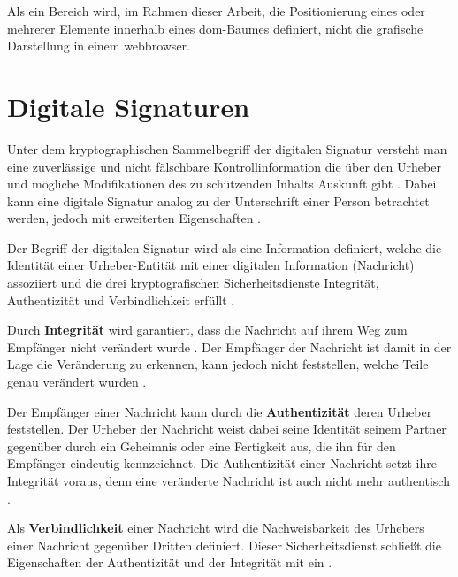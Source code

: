 Als ein Bereich wird, im Rahmen dieser Arbeit, die Positionierung eines oder mehrerer Elemente innerhalb eines \gls{dom}-Baumes definiert, nicht die grafische
Darstellung in einem \gls{webbrowser}.

\section{Digitale Signaturen}
\label{sec:GrundlagenDefinitionen:DigitaleSignaturen}
Unter dem kryptographischen Sammelbegriff der digitalen Signatur versteht man eine zuverlässige und nicht fälschbare Kontrollinformation die über den Urheber
und mögliche Modifikationen des zu schützenden Inhalts Auskunft gibt \cite{kits}. Dabei kann eine digitale Signatur analog zu der Unterschrift einer Person
betrachtet werden, jedoch mit erweiterten Eigenschaften \cite{esig:bsi,angewandte-kryptographie,krypto-pki-internet}.

Der Begriff der digitalen Signatur wird als eine Information definiert, welche die Identität einer Urheber-Entität mit einer digitalen Information (Nachricht)
assoziiert und die drei kryptografischen Sicherheitsdienste Integrität, Authentizität und Verbindlichkeit erfüllt
\cite{hac,angewandte-kryptographie,krypto-pki-internet}.

\label{sec:GrundlagenDefinitionen:DigitaleSignaturen:Integrität}
Durch \textbf{Integrität} wird garantiert, dass die Nachricht auf ihrem Weg zum Empfänger nicht verändert wurde \cite{niag}. Der Empfänger der Nachricht ist
damit in der Lage die Veränderung zu erkennen, kann jedoch nicht feststellen, welche Teile genau verändert wurden \cite{angewandte-kryptographie}.

\label{sec:GrundlagenDefinitionen:DigitaleSignaturen:Authentizität}
Der Empfänger einer Nachricht kann durch die \textbf{Authentizität} deren Urheber feststellen. Der Urheber der Nachricht weist dabei seine Identität seinem
Partner gegenüber durch ein Geheimnis oder eine Fertigkeit aus, die ihn für den Empfänger eindeutig kennzeichnet. Die Authentizität einer Nachricht setzt ihre
Integrität voraus, denn eine veränderte Nachricht ist auch nicht mehr authentisch \cite{kits,angewandte-kryptographie}.

\label{sec:GrundlagenDefinitionen:DigitaleSignaturen:Verbindlichkeit}
Als \textbf{Verbindlichkeit} einer Nachricht wird die Nachweisbarkeit des Urhebers einer Nachricht gegenüber Dritten definiert. Dieser Sicherheitsdienst schließt die
Eigenschaften der Authentizität und der Integrität mit ein \cite{kits,angewandte-kryptographie}.

